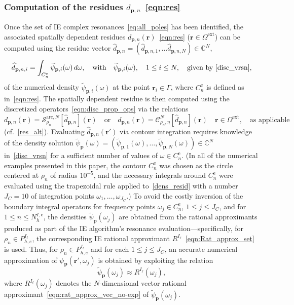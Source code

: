 \documentclass[11pt]{article}
\theoremstyle{plain}
\theoremstyle{remark}
\def \C{\mathbb{C}}
\def \br{\mathbf{r}}
\def \bp{\mathbf{p}}
\begin{document}
\subsubsection{Computation of the residues $d_{\bp,n}$~\eqref{eqn:res}}\label{sec:res_comp}
Once the set of IE complex resonances~\eqref{eq:all_poles} has been
identified, the associated spatially dependent residues
$d_{\bp,n}(\br)$~\eqref{eqn:res} ($\mathbf{r}\in\Omega^\mathrm{ext}$)
can be computed using the residue vector
$\widehat{d}_{\bp,n} = (\widehat{d}_{\bp,n,1},\dots\widehat{d}_{\bp,n,N}) \in \C^N$,
\begin{equation}\label{eqn:num_dens_res}
  \widehat{d}_{\bp,n,i} = \int_{C_n^\mathrm{e}} \widetilde{\psi}_{\bp,i}(\omega)\, d\omega, \quad \text{with} \quad \widetilde{\psi}_{\bp,i}(\omega),\quad 1\leq i\leq N, \quad \text{given by~\eqref{disc_vrsn}},
\end{equation}
of the numerical density $\widetilde{\psi}_{\bp,i}(\omega)$ at the
point $\mathbf{r}_i\in\Gamma$, where $C_n^\mathrm{e}$ is defined as
in~\eqref{eqn:res}.  The spatially dependent residue is then computed
using the discretized operators~\eqref{eqn:disc_prop_ops} via the
relations
\begin{equation*}
 d_{\bp,n}(\br) = \mathcal{S}^{\mathrm{arc},N}_{\rho_n}[\widehat{d}_{\bp,n}](\br) \quad \mbox{or} \quad d_{\bp,n}(\br) = \mathcal{C}_{\rho_n,\eta}^N[\widehat{d}_{\bp,n}](\br) \quad \br \in \Omega^\mathrm{ext},\quad\mbox{as applicable}
\end{equation*}
(cf.~\eqref{res_alt}). Evaluating $\widehat{d}_{\bp,n}(\br')$ via
contour integration requires knowledge of the density solution
$\widetilde{\psi}_\bp(\omega) =
(\widetilde{\psi}_{\bp,1}(\omega),\dots,\widetilde{\psi}_{\bp,N}(\omega))\in
\C^N$ in~\eqref{disc_vrsn} for a sufficient number of values of
$\omega\in C_n^\mathrm{e}$. (In all of the numerical examples
presented in this paper, the contour $C_n^\mathrm{e}$ was chosen as
the circle centered at $\rho_n$ of radius $10^{-5}$, and the necessary
integrals around $C_n^\mathrm{e}$ were evaluated using the trapezoidal
rule applied to~\eqref{dens_resid} with a number $J_C = 10$ of
integration points $\omega_1,\dots,\omega_{J_C}$.)  To avoid the
costly inversion of the boundary integral operators for frequency
points $\omega_j\in C_n^\mathrm{e}$, $1\leq j\leq J_C$, and for
$1\leq n\leq N_h^{I,\mathrm{e}}$, the densities
$\widetilde{\psi}_\bp(\omega_j)$ are obtained from the rational
approximants produced as part of the IE algorithm’s resonance
evaluation---specifically, for $\rho_n \in P_{h,e}^{I_\ell}$, the
corresponding IE rational approximant
$R^{I_\ell}$~\eqref{eqn:Rat_approx_set} is used. Thus, for
$\rho_n \in P_{h,e}^{I_\ell}$ and for each $1 \leq j \leq J_C$, an
accurate numerical approximation of $\psi_\bp(\br',\omega_j)$ is
obtained by exploiting the relation
\begin{equation}\label{psi-R}
\widetilde{\psi}_\bp(\omega_j) \approx R^{I_\ell}(\omega_j),
\end{equation}
where $R^{I_\ell}(\omega_j)$ denotes the $N$-dimensional vector
rational approximant~\eqref{eqn:rat_approx_vec_no-exp} of
$\widetilde{\psi}_\bp(\omega_j)$. 
\end{document}
